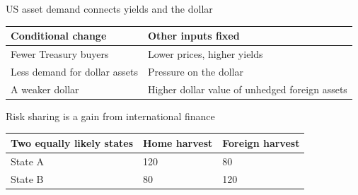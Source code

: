 \documentclass[12pt,aspectratio=169]{beamer}
\begin{document}
\begin{frame}{US asset demand connects yields and the dollar}
\begin{center}\begin{tabular}{@{}p{}p{}@{}}\toprule \textbf{Conditional change} & \textbf{Other inputs fixed}\\\midrule Fewer Treasury buyers & Lower prices, higher yields\\[2mm]
Less demand for dollar assets & Pressure on the dollar\\[2mm]
A weaker dollar & Higher dollar value of unhedged foreign assets\\\bottomrule\end{tabular}\end{center}
\end{frame}

\begin{frame}{Risk sharing is a gain from international finance}
\begin{center}\begin{tabular}{@{}lll@{}}\toprule \textbf{Two equally likely states} & \textbf{Home harvest} & \textbf{Foreign harvest}\\\midrule State A & 120 & 80\\[2mm]
State B & 80 & 120\\\bottomrule\end{tabular}\end{center}
\end{frame}
\end{document}
